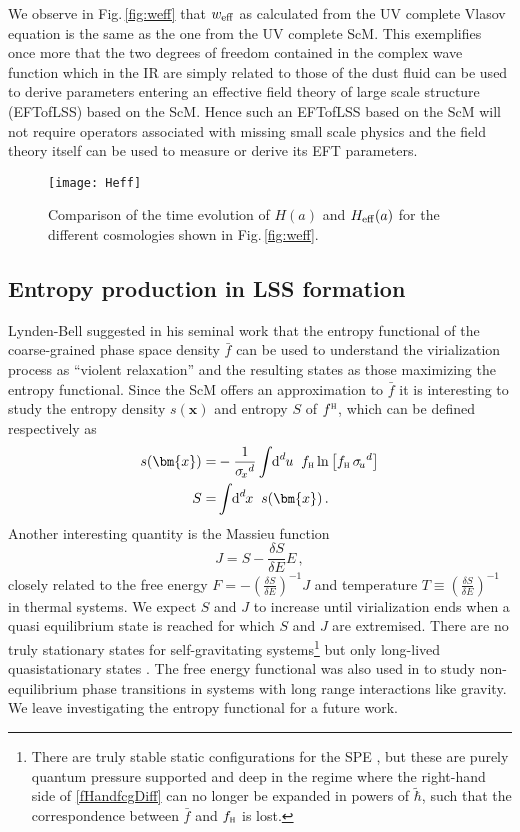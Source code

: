 \documentclass[twocolumn, nofootinbib, showpacs, superscriptaddress]{revtex4-1}
\renewcommand{\H}[0]{{\textsc{h}}}
\newcommand{\sigu}{{\sigma_{\! u}}}
\newcommand{\sigx}{{\sigma_{\! x}}}
\newcommand{\thbar}{\tilde\hbar}
\newcommand{\vol}[2]{\hspace{-0.8mm}\mbox{$\text{d}^{\hspace{-0.0mm}#1}$}\hspace{-0.2mm}#2\hspace{0.8mm}\ }
\newcommand{\vx}[0]{\bm{x} }
\begin{document}
We observe in Fig.\,\ref{fig:weff} that $w_{\rm eff}$ as calculated from the UV complete Vlasov equation is the same as the one from the UV complete ScM. This exemplifies once more that the two degrees of freedom contained in the complex wave function which in the IR are simply related to those of the dust fluid can be used to derive parameters entering an effective field theory of large scale structure (EFTofLSS) based on the ScM. Hence such an EFTofLSS based on the ScM will not require operators associated with missing small scale physics and the field theory itself can be used to measure or derive its EFT parameters.

\begin{figure}[t]
    \centering
    \texttt{[image: Heff]}
    \caption{Comparison of the time evolution of $H(a)$ and $H_{\rm eff}(a)$ for the different cosmologies shown in Fig.\,\ref{fig:weff}.}
    \label{fig:Heff}
\end{figure} 

\subsection{Entropy production in LSS formation}

Lynden-Bell suggested in his seminal work \cite{L67} that the entropy functional of the coarse-grained phase space density $\bar f$ can be used to understand the virialization process as ``violent relaxation'' and the resulting states as those maximizing the entropy functional.
Since the ScM offers an approximation to $\bar f$ it is interesting to study the entropy density $s(\vx)$ and entropy $S$ of $f^\H$, 
which can be defined respectively as
\begin{align}
s(\vx) = &- \frac{1}{\sigx^d} \int \vol{d}{u} f_\H \ln \left[ f_\H\, \sigu^d \right]\notag \\
S =& \int \vol{d}{x} s(\vx) \,.
\end{align}
Another interesting quantity is the Massieu function \cite{Katz1978}
\begin{equation}
J = S - \frac{\delta S}{ \delta E} E \,,
\end{equation}
closely related to the free energy  $F= - \left(\frac{\delta S}{ \delta E} \right)^{-1} J$ and temperature $T\equiv \left(\frac{\delta S}{ \delta E} \right)^{-1}$ in thermal systems.
We expect $S$ and $J$ to increase until virialization ends when a quasi equilibrium state is reached for which $S$ and $J$ are extremised. 
There are no truly stationary states for self-gravitating systems\footnote{There are truly stable static configurations for the SPE \cite{L77,MPT98,AS01}, 
but these are purely quantum pressure supported and deep in the regime where the right-hand side of \eqref{fHandfcgDiff} 
can no longer be expanded in powers of $\thbar$, such that the correspondence between $\bar f$ and $f_\H$ is lost.} 
but only long-lived quasistationary states \cite{StanisciaChavanisdeNinno2011}.  The free energy functional was also used 
in \cite{Chavanis2006, StanisciaChavanisdeNinno2011,Wei2016} to study non-equilibrium phase transitions in systems with long range interactions like gravity.
We leave investigating the entropy functional for a future work.
\end{document}
